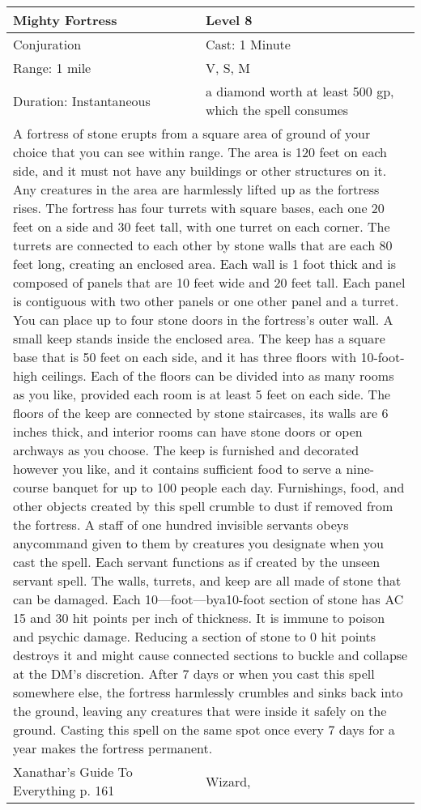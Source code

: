 \documentclass[11pt]{report}
\begin{document}
\begin{table}[H]
	\begin{tabular}{||p{6cm}|p{6cm}||}
		\hline\hline
		\bf{Mighty Fortress} & Level 8\\ \hline
		Conjuration & Cast: 1 Minute\\ \hline
		Range: 1 mile & V, S, M\\ \hline
		Duration: Instantaneous & a diamond worth at least 500 gp, which the spell consumes\\ \hline
		\multicolumn{2}{||p{12cm}||}{A fortress of stone erupts from a square area of ground of your choice that you can see within range. The area is 120 feet on each side, and it must not have any buildings or other structures on it. Any creatures in the area are harmlessly lifted up as the fortress rises.
The fortress has four turrets with square bases, each one 20 feet on a side and 30 feet tall, with one turret on each corner. The turrets are connected to each other by stone walls that are each 80 feet long, creating an enclosed area. Each wall is 1 foot thick and is composed of panels that are 10 feet wide and 20 feet tall. Each panel is contiguous with two other panels or one other panel and a turret. You can place up to four stone doors in the fortress’s outer wall.
A small keep stands inside the enclosed area. The keep has a square base that is 50 feet on each side, and it has three floors with 10-foot-high ceilings. Each of the floors can be divided into as many rooms as you like, provided each room is at least 5 feet on each side. The floors of the keep are connected by stone staircases, its walls are 6 inches thick, and interior rooms can have stone doors or open archways as you choose. The keep is furnished and decorated however you like, and it contains sufficient food to serve a nine-course banquet for up to 100 people each day. Furnishings, food, and other objects created by this spell crumble to dust if removed from the fortress.
A staff of one hundred invisible servants obeys anycommand given to them by creatures you designate when you cast the spell. Each servant functions as if created by the unseen servant spell.
The walls, turrets, and keep are all made of stone that can be damaged. Each 10—foot—bya10-foot section of stone has AC 15 and 30 hit points per inch of thickness. It is immune to poison and psychic damage. Reducing a section of stone to 0 hit points destroys it and might cause connected sections to buckle and collapse at the DM’s discretion.
After 7 days or when you cast this spell somewhere else, the fortress harmlessly crumbles and sinks back into the ground, leaving any creatures that were inside it safely on the ground.
Casting this spell on the same spot once every 7 days for a year makes the fortress permanent.}\\ \hline
Xanathar's Guide To Everything p. 161 & Wizard, \\ \hline\hline
	\end{tabular}
\end{table}
\end{document}
